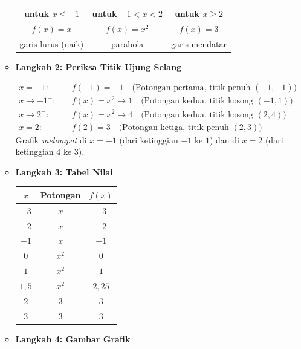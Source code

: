 \documentclass[10pt,a4paper]{article}
\newcounter{eqblock}
\newcommand{\reseteq}{%
  \stepcounter{eqblock}%
  \setcounter{equation}{0}%
  \renewcommand{\theHequation}{\arabic{eqblock}.\arabic{equation}}%
}
\begin{document}
\begin{enumerate}
\begin{itemize}
\begin{center}
\begin{tabular}{c|c|c}
untuk $x \le -1$ & untuk $-1 < x < 2$ & untuk $x \ge 2$ \\ \hline
$f(x) = x$ & $f(x) = x^2$ & $f(x) = 3$ \\
garis lurus (naik) & parabola & garis mendatar
\end{tabular}
\end{center}

\item \textbf{Langkah 2: Periksa Titik Ujung Selang}

\reseteq
\begin{align}
x = -1: \quad &f(-1) = -1 \quad \text{(Potongan pertama, titik penuh $(-1,-1)$)} \\
x \to -1^{+}: \quad &f(x) = x^2 \to 1 \quad \text{(Potongan kedua, titik kosong $(-1,1)$)} \\
x \to 2^{-}: \quad &f(x) = x^2 \to 4 \quad \text{(Potongan kedua, titik kosong $(2,4)$)} \\
x = 2: \quad &f(2) = 3 \quad \text{(Potongan ketiga, titik penuh $(2,3)$)}
\end{align}
Grafik \emph{melompat} di $x = -1$ (dari ketinggian $-1$ ke $1$) dan di $x = 2$ (dari ketinggian $4$ ke $3$).

\item \textbf{Langkah 3: Tabel Nilai}

\begin{center}
\begin{tabular}{c|c|c}
$x$ & Potongan & $f(x)$ \\ \hline
$-3$ & $x$ & $-3$ \\
$-2$ & $x$ & $-2$ \\
$-1$ & $x$ & $-1$ \\
$0$ & $x^2$ & $0$ \\
$1$ & $x^2$ & $1$ \\
$1{,}5$ & $x^2$ & $2{,}25$ \\
$2$ & $3$ & $3$ \\
$3$ & $3$ & $3$
\end{tabular}
\end{center}

\item \textbf{Langkah 4: Gambar Grafik}


\end{itemize}
\end{enumerate}
\end{document}
